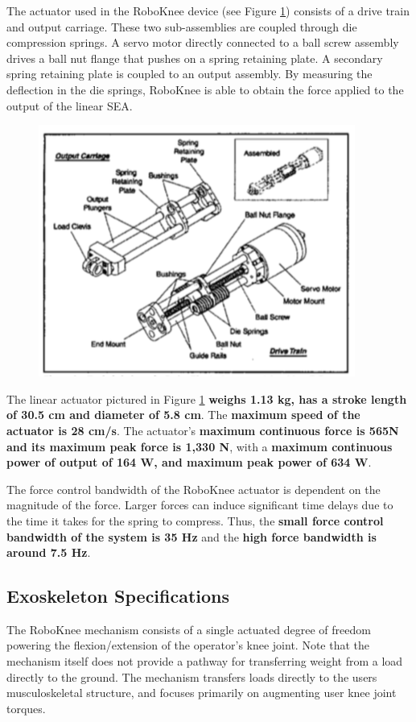 The actuator used in the RoboKnee device (see Figure \ref{fig:roboAct}) consists of a drive train and output carriage. These two sub-assemblies are coupled through die compression springs.  A servo motor directly connected to a ball screw assembly drives a ball nut flange that pushes on a spring retaining plate.  A secondary spring retaining plate is coupled to an output assembly.  By measuring the deflection in the die springs, RoboKnee is able to obtain the force applied to the output of the linear SEA.  
\begin{figure}[thpb]
\centering
\includegraphics[width=3.in]{exos/figs/roboKnee/roboSEA}
  \caption{}
  \vspace{-0.2in}
 \label{fig:roboAct}   
 \end{figure}

The linear actuator pictured in Figure \ref{fig:roboAct} { \bf weighs 1.13 kg, has a stroke length of 30.5 cm and diameter of 5.8 cm}.  The {\bf maximum speed of the actuator is 28 cm/s}.  The actuator's {\bf maximum continuous force is 565N and its maximum peak force is 1,330 N}, with a {\bf maximum continuous power of output of 164 W, and maximum peak power of 634 W}.   

The force control bandwidth of the RoboKnee actuator is dependent on the magnitude of the force.  Larger forces can induce significant time delays due to the time it takes for the spring to compress.  Thus, the {\bf small force control bandwidth of the system is 35 Hz} and the {\bf high force bandwidth is around 7.5 Hz}. 
 
 \subsection{Exoskeleton Specifications}
 
 The RoboKnee mechanism consists of a single actuated degree of freedom powering the flexion/extension of the operator's knee joint.  Note that the mechanism itself does not provide a pathway for transferring weight from a load directly to the ground.  The mechanism transfers loads directly to the users musculoskeletal structure, and focuses primarily on augmenting user knee joint torques.
 
